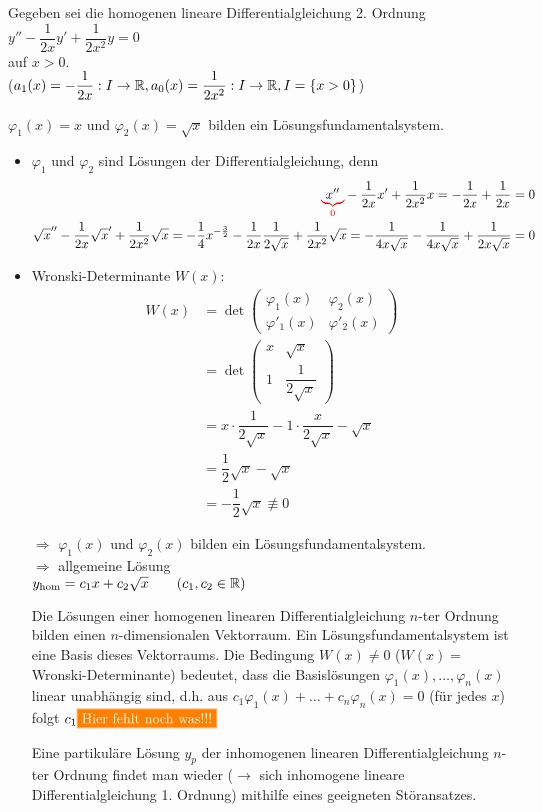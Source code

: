 \Bsp Gegeben sei die homogenen lineare Differentialgleichung 2. Ordnung\\
\hhspace{2cm}$y''-\dfrac{1}{2x}y'+\dfrac{1}{2x^2}y=0$\\
auf $x>0$.\\
($a_1(x)=-\dfrac{1}{2x}:I\to\mathbb{R}, a_0(x)=\dfrac{1}{2x^2}:I\to\mathbb{R}, I=\{x>0\}$)

\Beh $\varphi_1(x)=x$ und $\varphi_2(x)=\sqrt{x}$ bilden ein Lösungsfundamentalsystem.

\begin{itemize}
	\item $\varphi_1$ und $\varphi_2$ sind Lösungen der Differentialgleichung, denn\\
	\begin{align*}
	\redunderbrace{x''}{0}-\dfrac{1}{2x}x'+\dfrac{1}{2x^2}x=-\dfrac{1}{2x}+\dfrac{1}{2x}=0\\
	\sqrt{x}''-\dfrac{1}{2x}\sqrt{x}'+\dfrac{1}{2x^2}\sqrt{x}=-\dfrac{1}{4}x^{-\frac{3}{2}}-\dfrac{1}{2x}\dfrac{1}{2\sqrt{x}}+\dfrac{1}{2x^2}\sqrt{x}=-\dfrac{1}{4x\sqrt{x}}-\dfrac{1}{4x\sqrt{x}}+\dfrac{1}{2x\sqrt{x}}=0
	\end{align*}
	
	\item Wronski-Determinante $W(x)$:
	\begin{align*}
	W(x)&=\det\left(\begin{array}{cc}
	\varphi_1(x)&\varphi_2(x)\\
	\varphi'_1(x)&\varphi'_2(x)
	\end{array}\right)\\
	&=\det\left(\begin{array}{cc}
	x&\sqrt{x}\\
	1&\dfrac{1}{2\sqrt{x}}
	\end{array}\right)\\
	&=x\cdot\dfrac{1}{2\sqrt{x}}-1\cdot\dfrac{x}{2\sqrt{x}}-\sqrt{x}\\
	&=\dfrac{1}{2}\sqrt{x}-\sqrt{x}\\
	&=-\dfrac{1}{2}\sqrt{x}\not\equiv0
	\end{align*}
	
	$\Rightarrow$ $\varphi_1(x)$ und $\varphi_2(x)$ bilden ein Lösungsfundamentalsystem.\\
	$\Rightarrow$ allgemeine Lösung\\
	\hhspace{2cm}$y_\text{hom}=c_1x+c_2\sqrt{x}\qquad(c_1,c_2\in\mathbb{R})$
	
	\Bem Die Lösungen einer homogenen linearen Differentialgleichung $n$-ter Ordnung bilden einen $n$-dimensionalen Vektorraum. Ein Lösungsfundamentalsystem ist eine Basis dieses Vektorraums. Die Bedingung $W(x)\ne0$ ($W(x)=$Wronski-Determinante) bedeutet, dass die Basislösungen $\varphi_1(x),\ldots,\varphi_n(x)$ linear unabhängig sind, d.h. aus $c_1\varphi_1(x)+\ldots+c_n\varphi_n(x)=0$ (für jedes $x$) folgt $c_1\placeholder$
	
	Eine partikuläre Lösung $y_p$ der inhomogenen linearen Differentialgleichung $n$-ter Ordnung findet man wieder ($\rightarrow$ sich inhomogene lineare Differentialgleichung 1. Ordnung) mithilfe eines geeigneten Störansatzes.
\end{itemize}

